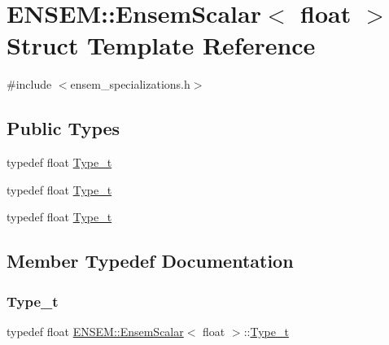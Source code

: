 \hypertarget{structENSEM_1_1EnsemScalar_3_01float_01_4}{}\section{E\+N\+S\+EM\+:\+:Ensem\+Scalar$<$ float $>$ Struct Template Reference}
\label{structENSEM_1_1EnsemScalar_3_01float_01_4}


{\ttfamily \#include $<$ensem\+\_\+specializations.\+h$>$}

\subsection*{Public Types}
\begin{DoxyCompactItemize}
\item 
typedef float \mbox{\hyperlink{structENSEM_1_1EnsemScalar_3_01float_01_4_a908908baf5b54ef6561962c858fb7183}{Type\+\_\+t}}
\item 
typedef float \mbox{\hyperlink{structENSEM_1_1EnsemScalar_3_01float_01_4_a908908baf5b54ef6561962c858fb7183}{Type\+\_\+t}}
\item 
typedef float \mbox{\hyperlink{structENSEM_1_1EnsemScalar_3_01float_01_4_a908908baf5b54ef6561962c858fb7183}{Type\+\_\+t}}
\end{DoxyCompactItemize}


\subsection{Member Typedef Documentation}
\mbox{\label{structENSEM_1_1EnsemScalar_3_01float_01_4_a908908baf5b54ef6561962c858fb7183}} 
\subsubsection{\texorpdfstring{Type\_t}{Type\_t}\hspace{0.1cm}{\footnotesize\ttfamily [1/3]}}
{\footnotesize\ttfamily typedef float \mbox{\hyperlink{structENSEM_1_1EnsemScalar}{E\+N\+S\+E\+M\+::\+Ensem\+Scalar}}$<$ float $>$\+::\mbox{\hyperlink{structENSEM_1_1EnsemScalar_3_01float_01_4_a908908baf5b54ef6561962c858fb7183}{Type\+\_\+t}}}

\mbox{\label{structENSEM_1_1EnsemScalar_3_01float_01_4_a908908baf5b54ef6561962c858fb7183}} 
